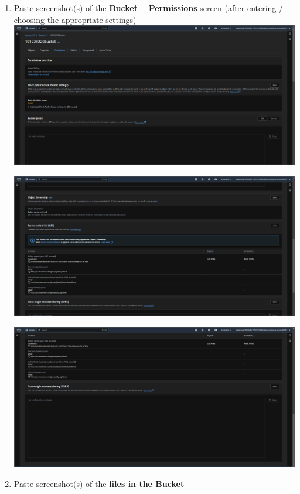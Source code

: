 \documentclass[11pt]{article}
\begin{document}
\begin{enumerate}[resume]
    \item Paste screenshot$($s$)$ of the \textbf{Bucket – Permissions} screen (after entering / choosing the appropriate settings)\\

    {\centering
    \includegraphics[width=5.8in]{pics/34a.png}
    }

    {\centering
    \includegraphics[width=5.8in]{pics/34b.png}
    }

    {\centering
    \includegraphics[width=5.8in]{pics/34c.png}
    }




    \item Paste screenshot$($s$)$ of the \textbf{files in the Bucket} \\
    

\end{enumerate}
\end{document}
